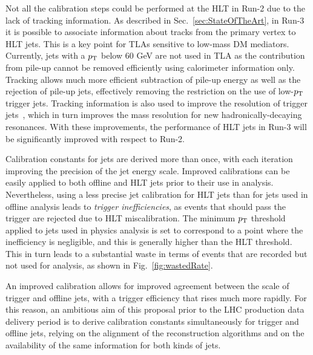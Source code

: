 Not all the calibration steps could be performed at the HLT in Run-2 due to the lack of tracking information. As described in Sec.~\ref{sec:StateOfTheArt}, in Run-3 it is possible to associate information about tracks from the primary vertex to HLT jets.  This is a key point for TLAs sensitive to low-mass DM mediators. Currently, jets with a $p_{\rm{T}}$ below 60 GeV are not used in TLA as the contribution from pile-up cannot be removed efficiently using calorimeter information only. Tracking allows much more efficient subtraction of pile-up energy as well as the rejection of pile-up jets, effectively removing the restriction on the use of low-$p_{\rm{T}}$ trigger jets. Tracking information is also used to improve the resolution of trigger jets~\cite{GSC}, which in turn improves the mass resolution for new hadronically-decaying resonances. 
With these improvements, the performance of HLT jets in Run-3 will be significantly improved with respect to Run-2. 

 
Calibration constants for jets are derived more than once, with each iteration improving the precision of the jet energy scale. Improved calibrations can be easily applied to both offline and HLT jets prior to their use in analysis. 
Nevertheless, using a less precise jet calibration for HLT jets than for jets used in offline analysis leads to \textit{trigger inefficiencies}, as events that should pass the trigger are rejected due to HLT miscalibration. 
The minimum $p_{\rm{T}}$ threshold applied to jets used in physics analysis is set to correspond to a point where the inefficiency is negligible, and this is generally higher than the HLT threshold. 
This in turn leads to a substantial waste in terms of events that are recorded but not used for analysis, as shown in Fig.~\ref{fig:wastedRate}. 

An improved calibration allows for improved agreement between the scale of trigger and offline jets, with a trigger efficiency that rises much more rapidly. 
For this reason, an ambitious aim of this proposal prior to the LHC production data delivery period is to derive calibration constants simultaneously for trigger and offline jets, relying on the alignment of the reconstruction algorithms and on the availability of the same information for both kinds of jets. 

